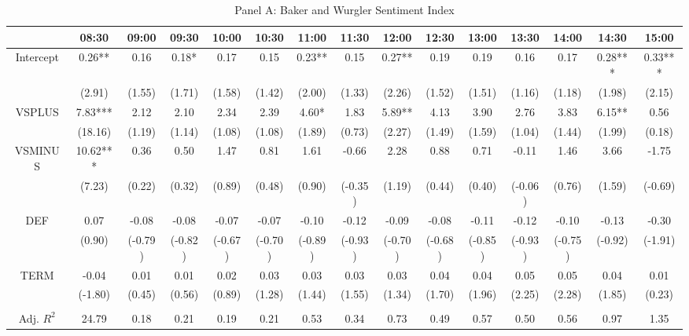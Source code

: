 \begin{table}[h]
\begin{threeparttable}
\begin{subtable}[t]{\linewidth}
\caption{Panel A: Baker and Wurgler Sentiment Index} 
\tiny
\begin{tabular}{ccccccccccccccc}
\toprule
                 & 08:30    & 09:00   & 09:30   & 10:00   & 10:30   & 11:00   & 11:30   & 12:00   & 12:30   & 13:00   & 13:30   & 14:00   & 14:30   & 15:00   \\ \midrule
 Intercept       & 0.26**   & 0.16    & 0.18*    & 0.17    & 0.15    & 0.23** & 0.15    & 0.27** & 0.19    & 0.19    & 0.16    & 0.17    & 0.28*** & 0.33*** \\
                 & (2.91)   & (1.55)  & (1.71)  & (1.58)  & (1.42)  & (2.00)  & (1.33)  & (2.26)  & (1.52)  & (1.51)  & (1.16)  & (1.18)  & (1.98)  & (2.15)  \\
 VSPLUS          & 7.83***  & 2.12    & 2.10    & 2.34    & 2.39    & 4.60*  & 1.83    & 5.89** & 4.13    & 3.90    & 2.76    & 3.83    & 6.15** & 0.56    \\
                 & (18.16)  & (1.19)  & (1.14)  & (1.08)  & (1.08)  & (1.89)  & (0.73)  & (2.27)  & (1.49)  & (1.59)  & (1.04)  & (1.44)  & (1.99)  & (0.18)  \\
 VSMINUS         & 10.62*** & 0.36    & 0.50    & 1.47    & 0.81    & 1.61    & -0.66   & 2.28    & 0.88    & 0.71    & -0.11   & 1.46    & 3.66    & -1.75   \\
                 & (7.23)   & (0.22)  & (0.32)  & (0.89)  & (0.48)  & (0.90)  & (-0.35) & (1.19)  & (0.44)  & (0.40)  & (-0.06) & (0.76)  & (1.59)  & (-0.69) \\
 DEF             & 0.07     & -0.08   & -0.08   & -0.07   & -0.07   & -0.10   & -0.12   & -0.09   & -0.08   & -0.11   & -0.12   & -0.10   & -0.13   & -0.30   \\
                 & (0.90)   & (-0.79) & (-0.82) & (-0.67) & (-0.70) & (-0.89) & (-0.93) & (-0.70) & (-0.68) & (-0.85) & (-0.93) & (-0.75) & (-0.92) & (-1.91) \\
 TERM            & -0.04    & 0.01    & 0.01    & 0.02    & 0.03    & 0.03    & 0.03    & 0.03    & 0.04    & 0.04    & 0.05    & 0.05    & 0.04    & 0.01    \\
                 & (-1.80)  & (0.45)  & (0.56)  & (0.89)  & (1.28)  & (1.44)  & (1.55)  & (1.34)  & (1.70)  & (1.96)  & (2.25)  & (2.28)  & (1.85)  & (0.23)  \\
                 &          &         &         &         &         &         &         &         &         &         &         &         &         &         \\
 Adj. $R^{2}$ & 24.79    & 0.18    & 0.21    & 0.19    & 0.21    & 0.53    & 0.34    & 0.73    & 0.49    & 0.57    & 0.50    & 0.56    & 0.97    & 1.35   \\
\bottomrule
\end{tabular}


\end{subtable}
\end{threeparttable}
\end{table}
